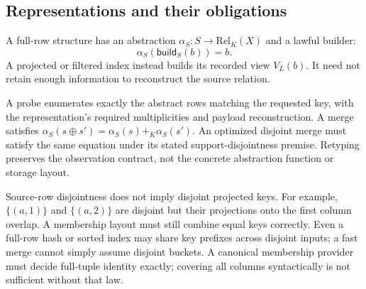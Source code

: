 \subsection{Representations and their obligations}
A full-row structure has an abstraction
$\alpha_S:S\to\mathrm{Rel}_K(X)$ and a lawful builder:
\[
 \alpha_S(\mathsf{build}_S(b))=b.
\]
A projected or filtered index instead builds its recorded view $V_L(b)$.
It need not retain enough information to reconstruct the source relation.
\begin{obligation}
A probe enumerates exactly the abstract rows matching the requested key,
with the representation's required multiplicities and payload reconstruction.
A merge satisfies
$\alpha_S(s\oplus s')=\alpha_S(s)+_K\alpha_S(s')$.
An optimized disjoint merge must satisfy the same equation under its stated
support-disjointness premise. Retyping preserves the observation contract,
not the concrete abstraction function or storage layout.
\end{obligation}
Source-row disjointness does not imply disjoint projected keys. For example,
$\{(a,1)\}$ and $\{(a,2)\}$ are disjoint but their projections onto the first
column overlap. A membership layout must still combine equal keys correctly.
Even a full-row hash or sorted index may share key prefixes across disjoint
inputs; a fast merge cannot simply assume disjoint buckets.
A canonical membership provider must decide full-tuple identity exactly;
covering all columns syntactically is not sufficient without that law.

